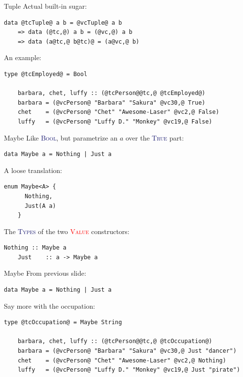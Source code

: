\documentclass[xcolor={usenames,dvipsnames}]{beamer}
\newcommand{\htycon}[1]{\textcolor{MidnightBlue}{\textsc{#1}}}
\newcommand{\hvalcon}[1]{\textcolor{Red}{\textsc{#1}}}
\begin{document}
\begin{frame}[fragile]{Tuple}
  Actual built-in sugar:
  \begin{lstlisting}[style=hask]
       data @tcTuple@ a b = @vcTuple@ a b
    => data (@tc,@) a b = (@vc,@) a b
    => data (a@tc,@ b@tc)@ = (a@vc,@ b)
  \end{lstlisting}

  \pause
  An example:
  \begin{lstlisting}[style=hask]
    type @tcEmployed@ = Bool

    barbara, chet, luffy :: (@tcPerson@@tc,@ @tcEmployed@)
    barbara = (@vcPerson@ "Barbara" "Sakura" @vc30,@ True)
    chet    = (@vcPerson@ "Chet" "Awesome-Laser" @vc2,@ False)
    luffy   = (@vcPerson@ "Luffy D." "Monkey" @vc19,@ False)
  \end{lstlisting}
\end{frame}

\begin{frame}[fragile]{Maybe}
  Like \htycon{Bool}, but parametrize an $a$ over the \htycon{True} part:
  \begin{lstlisting}[style=hask]
    data Maybe a = Nothing | Just a
  \end{lstlisting}

  \pause
  A loose translation:
  \begin{lstlisting}[style=hask]
    enum Maybe<A> {
      Nothing,
      Just(A a)
    }
  \end{lstlisting}

  \pause
  The \htycon{Types} of the two \hvalcon{Value} constructors:
  \begin{lstlisting}[style=hask]
    Nothing :: Maybe a
    Just    :: a -> Maybe a
  \end{lstlisting}
\end{frame}

\begin{frame}[fragile]{Maybe}
  From previous slide:
  \begin{lstlisting}[style=hask]
    data Maybe a = Nothing | Just a
  \end{lstlisting}

  \pause
  Say more with the occupation:
  \begin{lstlisting}[style=hask]
    type @tcOccupation@ = Maybe String

    barbara, chet, luffy :: (@tcPerson@@tc,@ @tcOccupation@)
    barbara = (@vcPerson@ "Barbara" "Sakura" @vc30,@ Just "dancer")
    chet    = (@vcPerson@ "Chet" "Awesome-Laser" @vc2,@ Nothing)
    luffy   = (@vcPerson@ "Luffy D." "Monkey" @vc19,@ Just "pirate")
  \end{lstlisting}
\end{frame}
\end{document}
